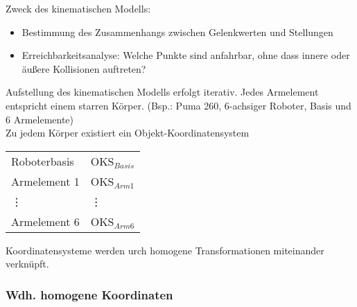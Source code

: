 Zweck des kinematischen Modells:
\begin{itemize}
\item Bestimmung des Zusammenhangs zwischen Gelenkwerten und Stellungen
\item Erreichbarkeitsanalyse: Welche Punkte sind anfahrbar, ohne dass innere oder äußere Kollisionen auftreten?
\end{itemize}
Aufstellung des kinematischen Modells erfolgt iterativ. Jedes Armelement entspricht einem starren Körper. (Bsp.: Puma 260, 6-achsiger Roboter, Basis und 6 Armelemente) \\
Zu jedem Körper existiert ein Objekt-Koordinatensystem
\begin{center}
\begin{tabular}{l@{\,\,\,}l}
Roboterbasis & OKS$_{Basis}$ \\
Armelement 1 & OKS$_{Arm1}$ \\
\vdots & \vdots \\
Armelement 6 & OKS$_{Arm6}$
\end{tabular}
\end{center}
Koordinatensysteme werden urch homogene Transformationen miteinander verknüpft.

\subsubsection*{Wdh. homogene Koordinaten}

\newcommand{\myrot}[1]{rot_{#1}(\alpha)}

